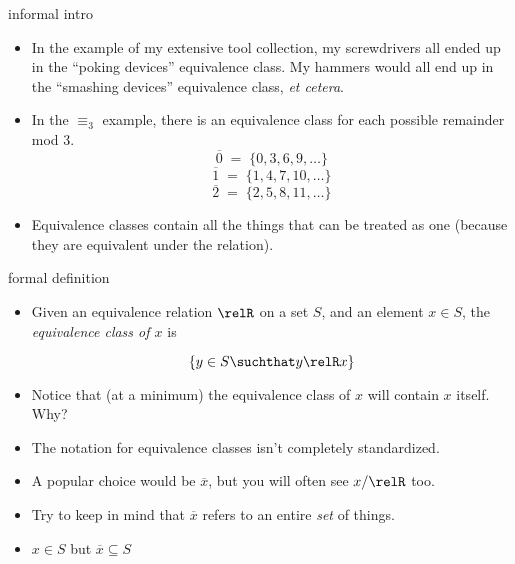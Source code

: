 \documentclass[handout,landscape]{beamer}
\begin{document}
\begin{frame}{informal intro}
\begin{itemize}
\item In the example of my extensive tool collection, my screwdrivers all ended up in the ``poking devices'' equivalence class.  My hammers would all end up in the ``smashing devices'' equivalence class, {\em et cetera}. \pause
\item In the $\equiv_3$ example, there is an equivalence class for each possible remainder mod 3. \pause
\[ \overline{0} \; = \; \{0, 3, 6, 9, \ldots \} \]
\[ \overline{1} \; = \; \{1, 4, 7, 10, \ldots \} \]
\[ \overline{2} \; = \; \{2, 5, 8, 11, \ldots \} \]
\pause

\item Equivalence classes contain all the things that can be treated as one (because they are equivalent under the relation). \pause
\end{itemize}
\end{frame}

\begin{frame}{formal definition}
\begin{itemize}
\item Given an equivalence relation $\relR$ on a set $S$, and an element $x \in S$, the {\em equivalence class of $x$} is 

\[ \{ y \in S \suchthat y \relR x \} \]
\pause

\item Notice that (at a minimum) the equivalence class of $x$ will contain $x$ itself. \pause Why? \pause
\item The notation for equivalence classes isn't completely standardized. \pause
\item A popular choice would be $\overline{x}$, but you will often see $x/\relR$ too. \pause
\item Try to keep in mind that $\overline{x}$ refers to an entire {\em set} of things. \pause
\item $x \in S$ but $\overline{x} \subseteq S$
\end{itemize}
\end{frame}
\end{document}
